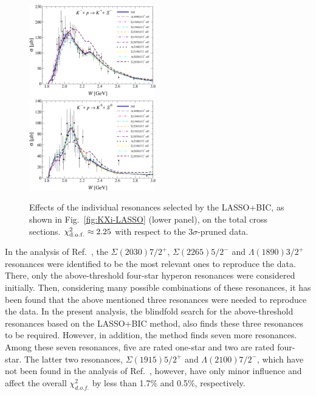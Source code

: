 \documentclass[10pt,aps,prc,superscriptaddress,twoside,twocolumn,nofootinbib,showpacs,preprintnumbers]{revtex4-1}
\begin{document}
\begin{figure}[t!]\centering
\includegraphics[width=0.49\textwidth,clip=1]{txsc1_lasso_pruned_3sigma_BackwardAS_lambda-5_scaledgwidth_no493_g_initial-1_a_resonances.pdf} ~
\includegraphics[width=0.49\textwidth,clip=1]{txsc2_lasso_pruned_3sigma_BackwardAS_lambda-5_scaledgwidth_no493_g_initial-1_a_resonances.pdf}
\caption{
Effects of the individual resonances selected by the LASSO+BIC, as shown in Fig.~\ref{fig:KXi-LASSO} (lower panel), on the total cross sections. $\chi^2_{\rm d.o.f.} \approx 2.25$ with respect to the $3\sigma$-pruned data.
\label{fig:KXi-txsc_res}
}
\end{figure}

In the analysis of Ref.~\cite{Jackson:2015dva}, the $\Sigma(2030)7/2^+$, $\Sigma(2265)5/2^-$ and $\Lambda(1890)3/2^+$ resonances were identified to be the most relevant ones to reproduce the data. There, only the above-threshold four-star hyperon resonances were considered initially. Then, considering many possible combinations of these resonances, it has been found that the above mentioned three resonances were needed to reproduce the data. In the present analysis, the blindfold search for the above-threshold resonances based on the LASSO+BIC method, also finds these three resonances to be required. However, in addition, the method finds seven more resonances. Among these seven resonances, five are  rated one-star and two are rated four-star. The latter two resonances, $\Sigma(1915)5/2^+$ and $\Lambda(2100)7/2^-$, which have not been found in the analysis of Ref.~\cite{Jackson:2015dva}, however, have only minor influence and affect the overall $\chi^2_{d.o.f.}$ by less than 1.7\% and 0.5\%, respectively.       
\end{document}
